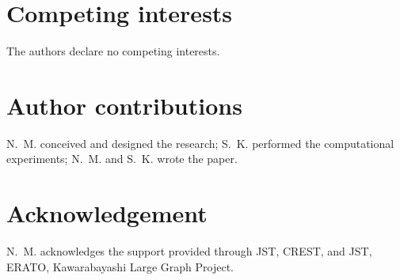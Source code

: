 \documentclass[fleqn,10pt]{wlscirep}
\begin{document}
\section*{Competing interests}
The authors declare no competing interests.

\section*{Author contributions}
N.~M. conceived and designed the research; S.~K. performed the computational experiments; N.~M. and S.~K. wrote the paper.

\section*{Acknowledgement}
N.~M. acknowledges the support provided through JST, CREST, and JST, ERATO, Kawarabayashi Large Graph Project.
\end{document}
